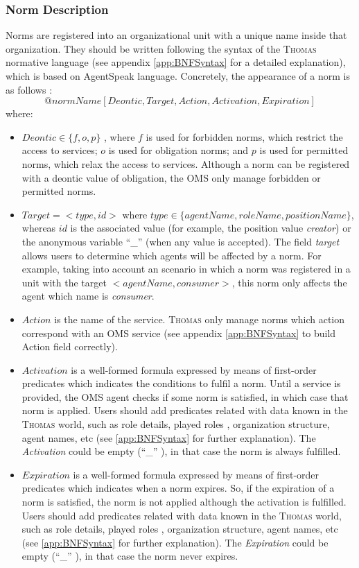 \subsubsection{Norm Description}
Norms are registered into an organizational unit with a unique name inside that organization. They should be written following the syntax of the \textsc{Thomas} normative language (see appendix \ref{app:BNFSyntax} for a detailed explanation), which is based on AgentSpeak language. Concretely, the appearance of a norm is as follows : \\
$$@normName[Deontic, Target, Action, Activation, Expiration]$$
where:

\begin{itemize}
 \item $Deontic \in \lbrace f,o,p \rbrace$ , where $f$ is used for forbidden norms, which restrict the access to services; $o$ is used for obligation norms; and $p$ is used for permitted norms, which relax the access to services. Although a norm can be registered with a deontic value  of obligation, the OMS only manage forbidden or permitted norms. 	
 \item $Target=<type,id>$ where $type \in   \lbrace agentName, roleName, positionName \rbrace $, whereas $id$ is the associated value (for example, the position value \textit{creator}) or the anonymous variable ``\_'' (when any value is accepted).  The field \textit{target} allows users to determine which agents will be affected by a norm. For example, taking into account an scenario in which a norm was registered in a unit with the target $<agentName, consumer>$, this norm only affects the agent which name is \textit{consumer}. 
 
 \item $Action$ is the name of the service. \textsc{Thomas} only manage norms which action correspond with an OMS service (see appendix \ref{app:BNFSyntax} to build Action field correctly).
 
 \item $Activation$ is a well-formed formula expressed by means of first-order predicates which indicates the conditions to fulfil a norm. Until a service is provided, the OMS agent checks if some norm is satisfied, in which case that norm is applied. Users should add predicates related with data known in the \textsc{Thomas} world, such as role details, played roles , organization structure, agent names, etc (see \ref{app:BNFSyntax} for further explanation). The \textit{Activation}  could be empty (``\_'' ), in that case the norm is always fulfilled.
 
 \item  $Expiration$ is a well-formed formula expressed by means of first-order predicates which indicates when a norm expires. So, if the expiration of a norm is satisfied, the norm is not applied although the activation is fulfilled. Users should add predicates related with data known in the \textsc{Thomas} world, such as role details, played roles , organization structure, agent names, etc (see \ref{app:BNFSyntax} for further explanation). The  \textit{Expiration} could be empty (``\_'' ), in that case the norm never expires.
 
\end{itemize}

